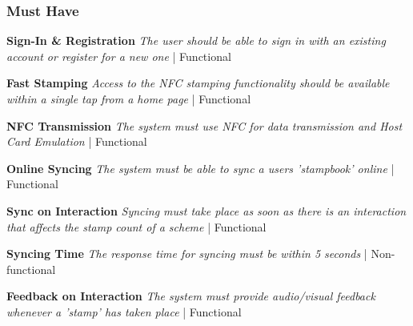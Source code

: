 \subsubsection{Must Have}
\begin{description}[leftmargin=!,labelwidth=\widthof{\bfseries Medium}]
    \item[M1] \textbf{Sign-In \& Registration} \newline
        \textit{The user should be able to sign in with an existing account or register for a new one}  | Functional
        
    \item[M2] \textbf{Fast Stamping} \newline
        \textit{Access to the NFC stamping functionality should be available within a single tap from a home page}  | Functional
    
    \item[M3] \textbf{NFC Transmission} \newline
        \textit{The system must use NFC for data transmission and Host Card Emulation}  | Functional
        
    \item[M4] \textbf{Online Syncing} \newline
        \textit{The system must be able to sync a users 'stampbook' online}  | Functional
        
    \item[M5] \textbf{Sync on Interaction} \newline
        \textit{Syncing must take place as soon as there is an interaction that affects the stamp count of a scheme}  | Functional
        
    \item[M6] \textbf{Syncing Time} \newline
        \textit{The response time for syncing must be within 5 seconds}  | Non-functional  
        
    \item[M7] \textbf{Feedback on Interaction} \newline
        \textit{The system must provide audio/visual feedback whenever a 'stamp' has taken place}  | Functional
        
\end{description}

